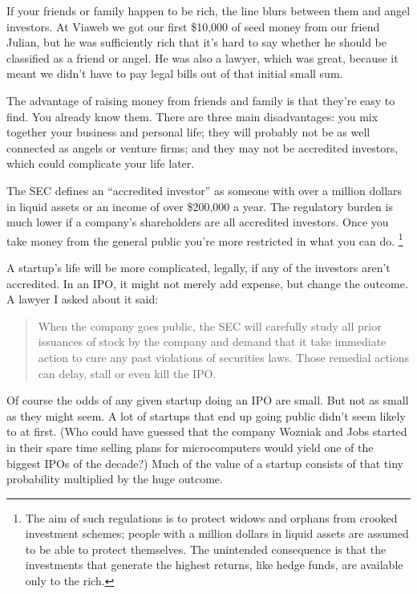\documentclass[12pt]{book}
\begin{document}
If your friends or family happen to be rich, the line blurs between them
and angel investors. At Viaweb we got our first \$10,000 of seed money
from our friend Julian, but he was sufficiently rich that it's hard to
say whether he should be classified as a friend or angel. He was also a
lawyer, which was great, because it meant we didn't have to pay legal
bills out of that initial small sum.

The advantage of raising money from friends and family is that they're
easy to find. You already know them. There are three main disadvantages:
you mix together your business and personal life; they will probably not
be as well connected as angels or venture firms; and they may not be
accredited investors, which could complicate your life later.

The SEC defines an ``accredited investor'' as someone with over a
million dollars in liquid assets or an income of over \$200,000 a year.
The regulatory burden is much lower if a company's shareholders are all
accredited investors. Once you take money from the general public you're
more restricted in what you can do. \footnote{The aim of such regulations is to protect widows and orphans
from crooked investment schemes; people with a million dollars in liquid
assets are assumed to be able to protect themselves. The unintended
consequence is that the investments that generate the highest returns,
like hedge funds, are available only to the rich.}

A startup's life will be more complicated, legally, if any of the
investors aren't accredited. In an IPO, it might not merely add expense,
but change the outcome. A lawyer I asked about it said:

\begin{quote}
When the company goes public, the SEC will carefully study all prior
issuances of stock by the company and demand that it take immediate
action to cure any past violations of securities laws. Those remedial
actions can delay, stall or even kill the IPO.
\end{quote}

Of course the odds of any given startup doing an IPO are small. But not
as small as they might seem. A lot of startups that end up going public
didn't seem likely to at first. (Who could have guessed that the company
Wozniak and Jobs started in their spare time selling plans for
microcomputers would yield one of the biggest IPOs of the decade?) Much
of the value of a startup consists of that tiny probability multiplied
by the huge outcome.
\end{document}
